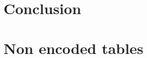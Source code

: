\documentclass[
    fontsize=12pt,
    headings=small,
    parskip=half,           %
    bibliography=totoc,
    numbers=noenddot,       %
    open=any,               %
    ]{scrreprt}
\begin{document}


\chapter{Conclusion}
\label{chap:conclusion}



\begin{raggedright}         %
  \printbibliography        %
  \label{sec:literaturverzeichnis}
\end{raggedright}


\appendix
\setcounter{figure}{0}
\renewcommand\thetable{A.\arabic{figure}}
\setcounter{table}{0}
\renewcommand\thetable{A.\arabic{table}}
\newpage

\chapter{Non encoded tables}
\end{document}
